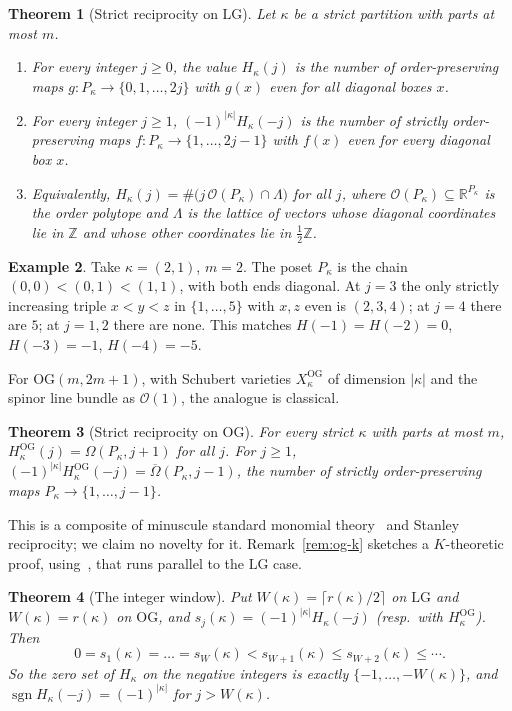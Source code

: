 \documentclass[submission]{FPSAC2027}
\newtheorem{theorem}{Theorem}[section]
\theoremstyle{definition}
\newtheorem{example}[theorem]{Example}
\theoremstyle{remark}
\newcommand{\LG}{\mathrm{LG}}
\newcommand{\OG}{\mathrm{OG}}
\newcommand{\cO}{\mathcal{O}}
\newcommand{\Z}{\mathbb{Z}}
\newcommand{\R}{\mathbb{R}}
\newcommand{\Om}{\Omega}
\newcommand{\Omb}{\overline{\Omega}}
\newcommand{\HOG}{H^{\OG}}
\newcommand{\ord}{\mathcal{O}}
\newcommand{\sgn}{\operatorname{sgn}}
\begin{document}
\begin{theorem}[Strict reciprocity on $\LG$]\label{thm:main}
Let $\kappa$ be a strict partition with parts at most $m$.
\begin{enumerate}[label=(\alph*)]
\item For every integer $j\ge 0$, the value $H_\kappa(j)$ is the number of order-preserving
maps $g\colon P_\kappa\to\{0,1,\dots,2j\}$ with $g(x)$ even for all diagonal boxes $x$.
\item For every integer $j\ge 1$, $(-1)^{|\kappa|}H_\kappa(-j)$ is the number of strictly
order-preserving maps $f\colon P_\kappa\to\{1,\dots,2j-1\}$ with $f(x)$ even for every diagonal
box $x$.
\item Equivalently, $H_\kappa(j)=\#\bigl(j\,\ord(P_\kappa)\cap\Lambda\bigr)$ for all $j$, where
$\ord(P_\kappa)\subseteq\R^{P_\kappa}$ is the order polytope and $\Lambda$ is the lattice of
vectors whose diagonal coordinates lie in $\Z$ and whose other coordinates lie in $\tfrac12\Z$.
\end{enumerate}
\end{theorem}

\begin{example}\label{ex:intro21}
Take $\kappa=(2,1)$, $m=2$. The poset $P_\kappa$ is the chain $(0,0)<(0,1)<(1,1)$, with both
ends diagonal. At $j=3$ the only strictly increasing triple $x<y<z$ in $\{1,\dots,5\}$ with $x,z$
even is $(2,3,4)$; at $j=4$ there are $5$; at $j=1,2$ there are none. This matches
$H(-1)=H(-2)=0$, $H(-3)=-1$, $H(-4)=-5$.
\end{example}

For $\OG(m,2m+1)$, with Schubert varieties $X^{\OG}_\kappa$ of dimension $|\kappa|$ and the
spinor line bundle as $\cO(1)$, the analogue is classical.

\begin{theorem}[Strict reciprocity on $\OG$]\label{thm:og}
For every strict $\kappa$ with parts at most $m$, $\HOG_\kappa(j)=\Om(P_\kappa,j+1)$ for
all $j$. For $j\ge1$, $(-1)^{|\kappa|}\HOG_\kappa(-j)=\Omb(P_\kappa,j-1)$, the number of
strictly order-preserving maps $P_\kappa\to\{1,\dots,j-1\}$.
\end{theorem}

This is a composite of minuscule standard monomial theory~\cite{LS86,Seshadri,GL96,Hibi87} and
Stanley reciprocity; we claim no novelty for it. Remark~\ref{rem:og-k} sketches a $K$-theoretic
proof, using~\cite[Lemma~4.5]{BR12}, that runs parallel to the $\LG$ case.

\begin{theorem}[The integer window]\label{thm:window}
Put $W(\kappa)=\lceil r(\kappa)/2\rceil$ on $\LG$ and $W(\kappa)=r(\kappa)$ on $\OG$, and
$s_j(\kappa)=(-1)^{|\kappa|}H_\kappa(-j)$ (resp.\ with $\HOG_\kappa$). Then
\[ 0=s_1(\kappa)=\dots=s_{W}(\kappa)<s_{W+1}(\kappa)\le s_{W+2}(\kappa)\le\cdots. \]
So the zero set of $H_\kappa$ on the negative integers is exactly
$\{-1,\dots,-W(\kappa)\}$, and $\sgn H_\kappa(-j)=(-1)^{|\kappa|}$ for $j>W(\kappa)$.
\end{theorem}
\end{document}
